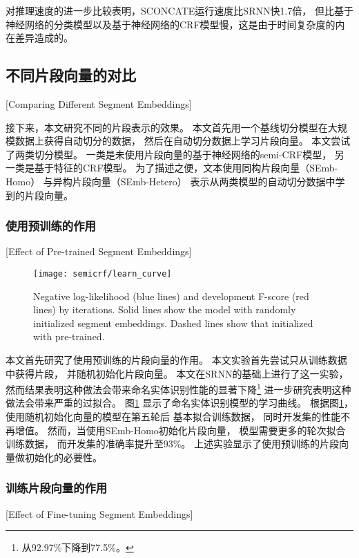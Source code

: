 对推理速度的进一步比较表明，SCONCATE运行速度比SRNN快1.7倍，
但比基于神经网络的分类模型以及基于神经网络的CRF模型慢，这是由于时间复杂度的内在差异造成的。

\subsection{不同片段向量的对比}[Comparing Different Segment Embeddings]

接下来，本文研究不同的片段表示的效果。
本文首先用一个基线切分模型在大规模数据上获得自动切分的数据，
然后在自动切分数据上学习片段向量。
本文尝试了两类切分模型。
一类是未使用片段向量的基于神经网络的semi-CRF模型，
另一类是基于特征的CRF模型。
为了描述之便，文本使用同构片段向量（SEmb-Homo）
与异构片段向量（SEmb-Hetero）
表示从两类模型的自动切分数据中学到的片段向量。

\subsubsection{使用预训练的作用}[Effect of Pre-trained Segment Embeddings]
\begin{figure}[t]
	\centering
	\texttt{[image: semicrf/learn\_curve]}
	\caption{Negative log-likelihood (blue lines) and development F-score (red lines) by iterations.
		Solid lines show the model with randomly initialized segment embeddings.
		Dashed lines show that initialized with pre-trained.}
	\label{fig:semicrf:learning-curve}
\end{figure}

本文首先研究了使用预训练的片段向量的作用。
本文实验首先尝试只从训练数据中获得片段，
并随机初始化片段向量。
本文在SRNN的基础上进行了这一实验，
然而结果表明这种做法会带来命名实体识别性能的显著下降\footnote{从92.97\%下降到77.5\%。}
进一步研究表明这种做法会带来严重的过拟合。
图\ref{fig:semicrf:learning-curve}
显示了命名实体识别模型的学习曲线。
根据图\ref{fig:semicrf:learning-curve}，
使用随机初始化向量的模型在第五轮后
基本拟合训练数据，
同时开发集的性能不再增值。
然而，当使用SEmb-Homo初始化片段向量，
模型需要更多的轮次拟合训练数据，
而开发集的准确率提升至93\%。
上述实验显示了使用预训练的片段向量做初始化的必要性。

\subsubsection{训练片段向量的作用}[Effect of Fine-tuning Segment Embeddings]

